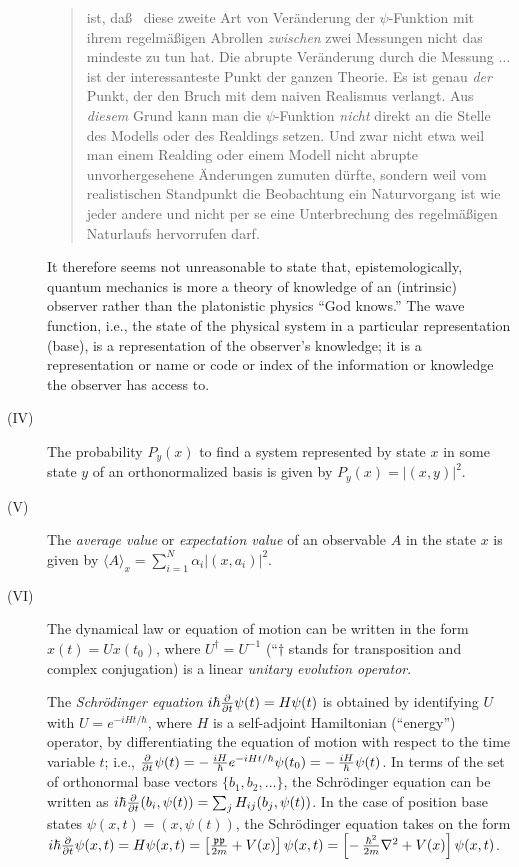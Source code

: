 \begin{description}
\begin{quote}
ist, da\ss~ diese zweite Art von Ver\"anderung der $\psi$-Funktion mit
ihrem regelm\"a\ss igen Abrollen {\em zwischen} zwei Messungen nicht das
mindeste zu tun hat. Die abrupte Ver\"anderung durch die Messung
$\ldots$ ist der interessanteste Punkt der ganzen Theorie. Es ist genau
{\em der} Punkt, der den Bruch mit dem naiven Realismus verlangt. Aus
{\em diesem} Grund kann man die $\psi$-Funktion {\em nicht} direkt an
die Stelle des Modells oder des Realdings setzen. Und zwar nicht etwa
weil man einem Realding oder einem Modell nicht abrupte unvorhergesehene
\"Anderungen zumuten d\"urfte, sondern weil vom realistischen Standpunkt
die Beobachtung ein Naturvorgang ist wie jeder andere und nicht per se
eine Unterbrechung des regelm\"a\ss igen Naturlaufs hervorrufen darf.
\end{quote}
It therefore seems not unreasonable to state that, epistemologically,
quantum mechanics is more a theory of knowledge of an
(intrinsic) observer rather than the platonistic physics ``God knows.''
The  wave function, i.e., the state of the physical system in a
particular
representation (base), is a representation of the observer's knowledge;
it is a representation or name or code or index of
the information or knowledge the observer has access to.


\item[(IV)]
The probability $P_y(x)$ to find a system represented by state $x$
in some state $y$ of an orthonormalized basis is given by
$P_y(x)=\vert (x,y) \vert^2 $.


\item[(V)]
The {\em average value} or {\em expectation value} of an observable
$A$ in the state
$ x$
is given by
$\langle A\rangle_ x =
\sum_{i=1}^N \alpha_i
\vert (x,a_i) \vert^2$.

\item[(VI)]
The dynamical law or equation of motion can be written in the form
$x (t) =Ux (t_0) $,
where $U^\dagger =U^{-1}$ (``$\dagger $ stands for transposition and
complex conjugation) is a
linear {\em unitary evolution operator}.

The {\em Schr\"odinger equation}
$
i\hbar {\partial \over \partial t}  \psi (t)    =
H \psi (t) $
 is obtained by identifying $U$ with
$U=e^{-iHt/\hbar }$,
where $H$ is a self-adjoint  Hamiltonian (``energy'') operator,
by differentiating the equation of motion
with respect to the time variable $t$;
i.e.,
$
 {\partial \over \partial t} \psi (t) =-\,{iH\over
\hbar
}e^{-i{H}t/\hbar}
\psi (t_0 ) = -\,{i{H}\over \hbar } \psi (t)
$.
In terms of the
set of orthonormal base vectors $\{ b_1, b_2, \ldots
\}$, the Schr\"odinger equation can be written as
$i\hbar {\partial \over \partial t} ( b_i , \psi (t) )   =
\sum_{j}
H_{ij}( b_j, \psi (t) )$.
In the case of position base states $\psi (x,t)=( x, \psi (t)
)$, the Schr\"odinger equation takes on the form
 $
i\hbar {\partial \over \partial t}  \psi (x,t) =
{H} \psi (x,t)=\left[{{{\frak p}} {{\frak p}}\over 2m}+
{V}(x)\right]\psi (x,t) = \left[-\,{\hbar^2
\over
2m}\nabla^2+V(x)\right] \psi (x,t)$.


\end{description}
